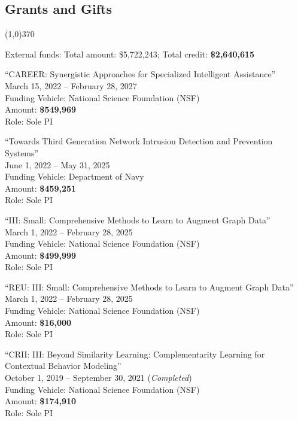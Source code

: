 \documentclass[10pt]{article}
\newenvironment{myindentpar}[1]%
{\begin{list}{}%
         {\setlength{\leftmargin}{#1}}%
         \item[]%
}
{\end{list}}
\newcounter{list}
\begin{document}
\subsection{\sc Grants and Gifts}
\vspace{-0.4cm} \line(1,0){370} \vspace{-0.1cm}

\begin{myindentpar}{0.75cm}

\hspace{-0.75cm}External funds: Total amount: \$5,722,243; Total credit: \textbf{\$2,640,615}

\hspace{-0.75cm}``CAREER: Synergistic Approaches for Specialized Intelligent Assistance'' \\
March 15, 2022 -- February 28, 2027 \\
Funding Vehicle: National Science Foundation (NSF) \\
Amount: \textbf{\$549,969} \\
Role: {Sole PI}

\hspace{-0.75cm}``Towards Third Generation Network Intrusion Detection and Prevention Systems'' \\
June 1, 2022 -- May 31, 2025 \\
Funding Vehicle: Department of Navy \\
Amount: \textbf{\$459,251} \\
Role: {Sole PI}

\hspace{-0.75cm}``III: Small: Comprehensive Methods to Learn to Augment Graph Data'' \\
March 1, 2022 -- February 28, 2025 \\
Funding Vehicle: National Science Foundation (NSF) \\
Amount: \textbf{\$499,999} \\
Role: {Sole PI}

\hspace{-0.75cm}``REU: III: Small: Comprehensive Methods to Learn to Augment Graph Data'' \\
March 1, 2022 -- February 28, 2025 \\
Funding Vehicle: National Science Foundation (NSF) \\
Amount: \textbf{\$16,000} \\
Role: {Sole PI}

\hspace{-0.75cm}``CRII: III: Beyond Similarity Learning: Complementarity Learning for Contextual Behavior Modeling'' \\
October 1, 2019 -- September 30, 2021 (\emph{Completed}) \\
Funding Vehicle: National Science Foundation (NSF) \\
Amount: \textbf{\$174,910} \\
Role: {Sole PI}


\end{myindentpar}
\end{document}
